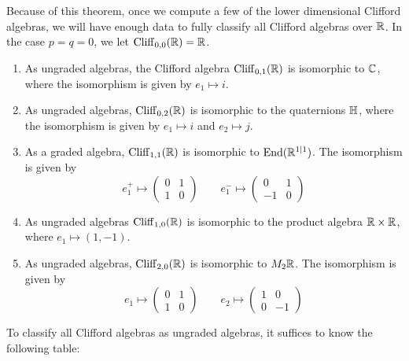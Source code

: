 %
Because of this theorem, once we compute a few of the lower dimensional
Clifford algebras, we will have enough data to fully classify all Clifford
algebras over $\mathbb{R}$. In the case $p = q = 0$, we let $\operatorname{Cliff}_{0,0}(\mathbb{R}) = \mathbb{R}$.
%
\begin{exmp}\enumbreak
\begin{enumerate}
  \item As ungraded algebras, the Clifford algebra $\operatorname{Cliff}_{0,1}(\mathbb{R})$ is isomorphic
  to $\mathbb{C}$, where the isomorphism is given by $e_1 \mapsto i$.
  \item As ungraded algebras, $\operatorname{Cliff}_{0,2}(\mathbb{R})$ is isomorphic to the quaternions
  $\mathbb{H}$, where the isomorphism is given by $e_1 \mapsto i$ and $e_2 \mapsto j$.
  \item As a graded algebra, $\operatorname{Cliff}_{1,1}(\mathbb{R})$ is isomorphic to $\operatorname{End}(\mathbb{R}^{1|1})$.
  The isomorphism is given by
  \[
  e_1^+ \mapsto \begin{pmatrix}
  0 & 1 \\
  1 & 0
  \end{pmatrix} \qquad e_1^- \mapsto \begin{pmatrix}
  0 & 1 \\
  -1 & 0
  \end{pmatrix}
  \]
  \item As ungraded algebras $\operatorname{Cliff}_{1,0}(\mathbb{R})$ is isomorphic to the product
  algebra $\mathbb{R} \times \mathbb{R}$, where $e_1 \mapsto (1,-1)$.
  \item As ungraded algebras, $\operatorname{Cliff}_{2,0}(\mathbb{R})$ is isomorphic to $M_2\mathbb{R}$. The
  isomorphism is given by
  \[
  e_1 \mapsto \begin{pmatrix}
  0 & 1 \\
  1 & 0
  \end{pmatrix} \qquad e_2 \mapsto \begin{pmatrix}
  1 & 0 \\
  0 & -1
  \end{pmatrix}
  \]
\end{enumerate}
\end{exmp}
%
To classify all Clifford algebras as ungraded algebras, it suffices to know
the following table: \\\\
